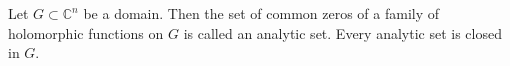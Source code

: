 Let $G \subset \mathbb{C}^n$ be a domain. Then the set of common zeros of a family of holomorphic functions on $G$ is called an analytic set. Every analytic set is closed in $G$.
